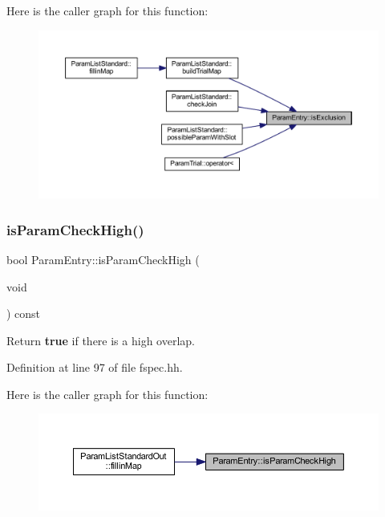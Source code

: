 Here is the caller graph for this function\+:
\nopagebreak
\begin{figure}[H]
\begin{center}
\leavevmode
\includegraphics[width=350pt]{class_param_entry_a1c72a43ac9238f9fae35f38b88ef2010_icgraph}
\end{center}
\end{figure}
\mbox{\label{class_param_entry_ac4acfd4bea55a34fedd04931b29b4f8c}} 
\subsubsection{\texorpdfstring{isParamCheckHigh()}{isParamCheckHigh()}}
{\footnotesize\ttfamily bool Param\+Entry\+::is\+Param\+Check\+High (\begin{DoxyParamCaption}\item[{void}]{ }\end{DoxyParamCaption}) const\hspace{0.3cm}{\ttfamily [inline]}}



Return {\bfseries{true}} if there is a high overlap. 



Definition at line 97 of file fspec.\+hh.

Here is the caller graph for this function\+:
\nopagebreak
\begin{figure}[H]
\begin{center}
\leavevmode
\includegraphics[width=350pt]{class_param_entry_ac4acfd4bea55a34fedd04931b29b4f8c_icgraph}
\end{center}
\end{figure}
\mbox{\label{class_param_entry_a7dd16288914ec41f8936095d74d943f1}} 
